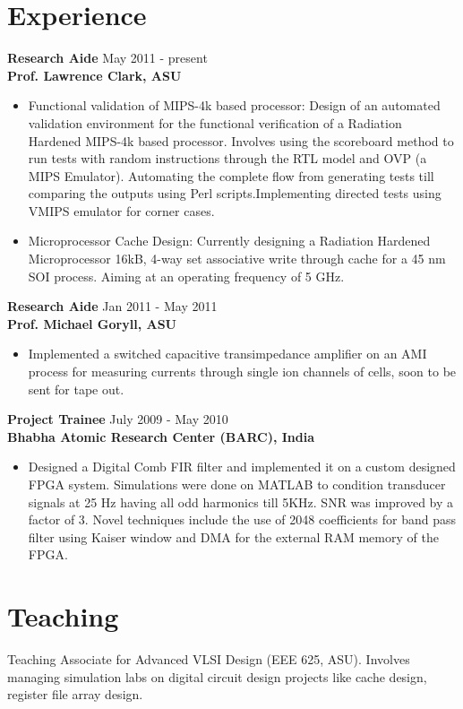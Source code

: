 \documentclass[margin]{res}
\begin{document}
\begin{resume}
\section{Experience}
{\bf Research Aide} \hfill May 2011 - present\\
{\bf Prof. Lawrence Clark, ASU}
\begin{itemize}
	\item Functional validation of MIPS-4k based processor: Design of an automated validation environment for the functional verification of a Radiation Hardened MIPS-4k based processor. Involves using the scoreboard method to run tests with random instructions through the RTL model and OVP (a MIPS Emulator). Automating the complete flow from generating tests till comparing the outputs using Perl scripts.Implementing directed tests using VMIPS emulator for corner cases.	
	\item Microprocessor Cache Design: Currently designing a Radiation Hardened Microprocessor 16kB, 4-way set associative write through cache for a 45 nm SOI process. Aiming at an operating frequency of 5 GHz.
\end{itemize} 

{\bf Research Aide} \hfill Jan 2011 - May 2011\\
{\bf Prof. Michael Goryll, ASU}
\begin{itemize}
	\item Implemented a switched capacitive transimpedance amplifier on an AMI process for measuring currents through single ion channels of cells, soon to be sent for tape out.
\end{itemize}
 
{\bf Project Trainee} \hfill July 2009 - May 2010\\
{\bf Bhabha Atomic Research Center (BARC), India}
\begin{itemize} 
	\item Designed a Digital Comb FIR filter and implemented it on a custom designed FPGA system. Simulations were done on MATLAB to condition transducer signals at 25 Hz having all odd harmonics till 5KHz. SNR was improved by a factor of 3. Novel techniques include the use of 2048 coefficients for band pass filter using Kaiser window and DMA for the external RAM memory of the FPGA.
\end{itemize} 


\section{Teaching}
Teaching Associate for Advanced VLSI Design (EEE 625, ASU). Involves managing simulation labs on digital circuit design projects like cache design, register file array design.

\end{resume}
\end{document}
